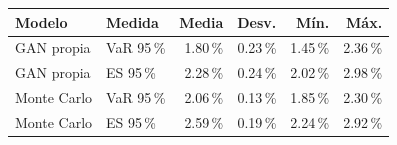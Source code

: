 \begin{tabular}{@{}llrrrr@{}}
\toprule
\textbf{Modelo} & \textbf{Medida} & \textbf{Media} & \textbf{Desv.} & \textbf{Mín.} & \textbf{Máx.} \\
\midrule
GAN propia & VaR 95\,\% & 1.80\,\% & 0.23\,\% & 1.45\,\% & 2.36\,\% \\
GAN propia & ES 95\,\% & 2.28\,\% & 0.24\,\% & 2.02\,\% & 2.98\,\% \\
Monte Carlo & VaR 95\,\% & 2.06\,\% & 0.13\,\% & 1.85\,\% & 2.30\,\% \\
Monte Carlo & ES 95\,\% & 2.59\,\% & 0.19\,\% & 2.24\,\% & 2.92\,\% \\
\bottomrule
\end{tabular}

